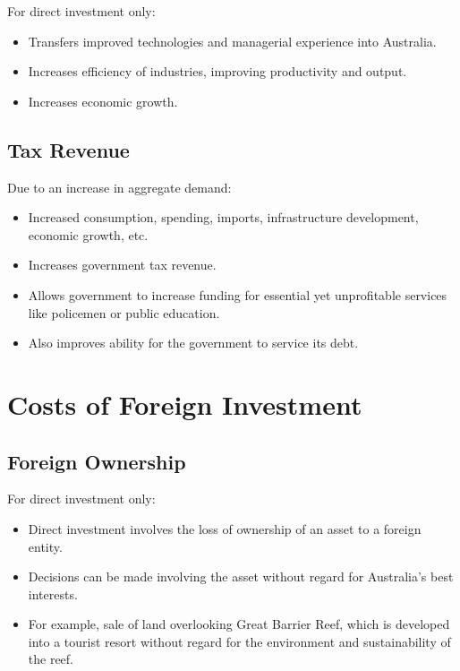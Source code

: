 \documentclass[a4paper,11pt]{article}
\begin{document}
For direct investment only:

\begin{itemize}
\item Transfers improved technologies and managerial experience into Australia.
\item Increases efficiency of industries, improving productivity and output.
\item Increases economic growth.
\end{itemize}


\subsection{Tax Revenue}

Due to an increase in aggregate demand:

\begin{itemize}
\item Increased consumption, spending, imports, infrastructure development,
	economic growth, etc.
\item Increases government tax revenue.
\item Allows government to increase funding for essential yet unprofitable
	services like policemen or public education.
\item Also improves ability for the government to service its debt.
\end{itemize}




\section{Costs of Foreign Investment}

\subsection{Foreign Ownership}

For direct investment only:

\begin{itemize}
\item Direct investment involves the loss of ownership of an asset to a foreign
	entity.
\item Decisions can be made involving the asset without regard for Australia's
	best interests.
\item For example, sale of land overlooking Great Barrier Reef, which is
	developed into a tourist resort without regard for the environment and
	sustainability of the reef.
\end{itemize}
\end{document}
